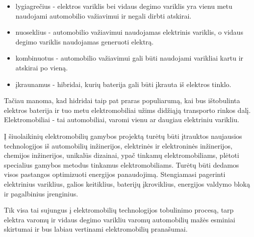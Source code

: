 \documentclass[12pt, titlepage]{article}
\begin{document}
    \begin{itemize}
        \item lygiagrečius - elektros variklis bei vidaus degimo variklis yra vienu metu naudojami automobilio važiavimui ir negali dirbti atskirai.
        \item nuoseklius - automobilio važiavimui naudojamas elektrinis variklis, o vidaus degimo variklis naudojamas generuoti elektrą.
        \item kombinuotus - automobilio važiavimui gali būti naudojami varikliai kartu ir atskirai po vieną.
        \item įkraunamus - hibridai, kurių baterija gali būti įkrauta iš elektros tinklo.
    \end{itemize}
Tačiau manoma, kad hidridai taip pat praras populiarumą, kai bus ištobulinta elektros baterija ir tuo metu elektromobiliai užims  didžiąją transporto rinkos dalį. Elektromobiliai - tai automobiliai, varomi vienu ar daugiau elektriniu varikliu. 

Į šiuolaikinių elektromobilių gamybos projektą turėtų būti įtrauktos
naujausios technologijos iš automobilių inžinerijos,
elektrinės ir elektroninės inžinerijos, chemijos inžinerijos, unikalūs dizainai, ypač tinkamų elektromobiliams, plėtoti specialius gamybos metodus
tinkamus elektromobiliams. Turėtų būti dedamos visos pastangos optimizuoti
energijos panaudojimą. Stengiamasi pagerinti elektrinius variklius, galios keitiklius, baterijų įkroviklius, energijos valdymo bloką ir pagalbinius įrenginius.\parencite{chan2002state}

Tik visa tai sujungus į elektromobilių technologijos tobulinimo procesą, tarp elektra varomų  ir vidaus degimo varikliu varomų automobilių mažės esminiai skirtumai ir bus labiau vertinami elektromobilių pranašumai.
\end{document}
